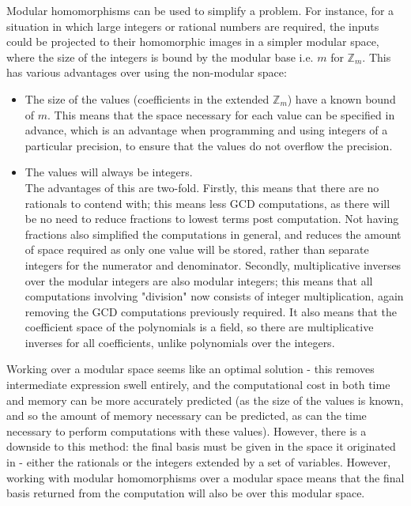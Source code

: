 \documentclass[letterpaper,12pt,titlepage,oneside,final]{book}
\begin{document}
Modular homomorphisms can be used to simplify a problem.  For instance, for a situation in which large integers or rational numbers are required, the inputs could be projected to their homomorphic images in a simpler modular space, where the size of the integers is bound by the modular base i.e. ${m}$ for ${\mathbb{Z}_m}$.  This has various advantages over using the non-modular space:
\begin{itemize}
  \item The size of the values (coefficients in the extended ${\mathbb{Z}_m}$) have a known bound of ${m}$.  This means that the space necessary for each value can be specified in advance, which is an advantage when programming and using integers of a particular precision, to ensure that the values do not overflow the precision.
  \item The values will always be integers.\\The advantages of this are two-fold.  Firstly, this means that there are no rationals to contend with; this means less GCD computations, as there will be no need to reduce fractions to lowest terms post computation.  Not having fractions also simplified the computations in general, and reduces the amount of space required as only one value will be stored, rather than separate integers for the numerator and denominator.  Secondly, multiplicative inverses over the modular integers are also modular integers; this means that all computations involving "division" now consists of integer multiplication, again removing the GCD computations previously required.  It also means that the coefficient space of the polynomials is a field, so there are multiplicative inverses for all coefficients, unlike polynomials over the integers.
\end{itemize}

Working over a modular space seems like an optimal solution - this removes intermediate expression swell entirely, and the computational cost in both time and memory can be more accurately predicted (as the size of the values is known, and so the amount of memory necessary can be predicted, as can the time necessary to perform computations with these values).  However, there is a downside to this method: the final basis must be given in the space it originated in - either the rationals or the integers extended by a set of variables.  However, working with modular homomorphisms over a modular space means that the final basis returned from the computation will also be over this modular space.  
\end{document}
